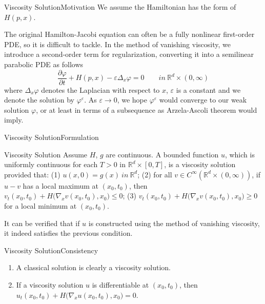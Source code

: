 \documentclass[english]{pkuslide}
\begin{document}
	\begin{frame}{Viscosity Solution}{Motivation}
We assume the Hamiltonian has the form of $H(p, x)$.

The original Hamilton-Jacobi equation can often be a fully nonlinear first-order PDE, so it is difficult to tackle. In the method of vanishing viscosity, we introduce a second-order term for regularization, converting it into a semilinear parabolic PDE as follows
\begin{equation}
\frac{\partial \varphi}{\partial t} + H(p, x) - \varepsilon \Delta_{x}{\varphi}  = 0  \qquad in\  \mathbb{R}^{d} \times (0,\infty) 
\end{equation}
where $\Delta_{x}{\varphi}$ denotes the Laplacian with respect to $x$, $\varepsilon$ is a constant and we denote the solution by $\varphi^\varepsilon$. As $\varepsilon \to 0$, we hope $\varphi^\varepsilon$ would converge to our weak solution $\varphi$, or at least in terms of a subsequence as Arzela-Ascoli theorem would imply.
	\end{frame}
\begin{frame}{Viscosity Solution}{Formulation}
\begin{exampleblock}{Viscosity Solution}
Assume $H$, $g$ are continuous. A bounded function $u$, which is uniformly continuous for each $T > 0$ in \begin{math} \mathbb{R}^{d} \times [0,T] \end{math}, is a viscosity solution provided that: (1) \begin{math} u(x,0) = g(x)  \  in\  \mathbb{R}^{d} \end{math}; (2) for all \begin{math} v \in C^\infty(\mathbb{R}^{d} \times (0,\infty)) \end{math}, if $u-v$ has a local maximum at $(x_0, t_0)$, then \begin{math} v_t{(x_0, t_0)} + H(\nabla _x{v(x_0, t_0), x_0)} \leq 0\end{math}; (3) \begin{math} v_t{(x_0, t_0)} + H(\nabla _x{v(x_0, t_0), x_0)} \geq 0\end{math} for a local minimum at $(x_0, t_0)$.
\end{exampleblock}
It can be verified that if $u$ is constructed using the method of vanishing viscosity, it indeed satisfies the previous condition.
	\end{frame}
	\begin{frame}{Viscosity Solution}{Consistency}
\begin{enumerate}[<+->]
\item A classical solution is clearly a viscosity solution.
\item If a viscosity solution $u$ is differentiable at $(x_0, t_0)$, then \begin{math} u_t{(x_0, t_0)} + H(\nabla _x{u(x_0, t_0), x_0)} = 0\end{math}.
\end{enumerate}
	\end{frame}
\end{document}
